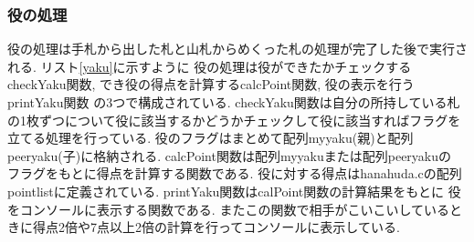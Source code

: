 \documentclass[a4j]{jarticle}
\begin{document}
    \subsubsection{役の処理}
    役の処理は手札から出した札と山札からめくった札の処理が完了した後で実行される. リスト\ref{yaku}に示すように
    役の処理は役ができたかチェックするcheckYaku関数, でき役の得点を計算するcalcPoint関数, 役の表示を行うprintYaku関数
    の3つで構成されている. checkYaku関数は自分の所持している札の1枚ずつについて役に該当するかどうかチェックして役に該当すればフラグを
    立てる処理を行っている. 役のフラグはまとめて配列myyaku(親)と配列peeryaku(子)に格納される. calcPoint関数は配列myyakuまたは配列peeryakuの
    フラグをもとに得点を計算する関数である. 役に対する得点はhanahuda.cの配列pointlistに定義されている. printYaku関数はcalPoint関数の計算結果をもとに
    役をコンソールに表示する関数である. またこの関数で相手がこいこいしているときに得点2倍や7点以上2倍の計算を行ってコンソールに表示している.
\end{document}
